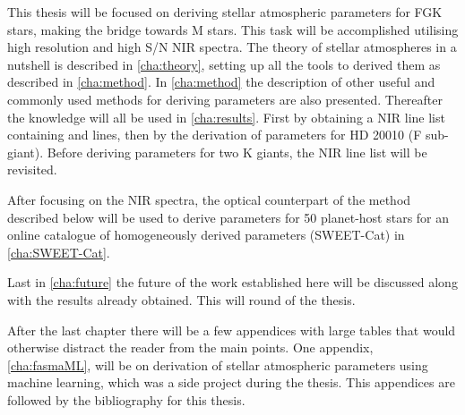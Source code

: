 This thesis will be focused on deriving stellar atmospheric parameters for FGK stars, making the
bridge towards M stars. This task will be accomplished utilising high resolution and high S/N NIR
spectra. The theory of stellar atmospheres in a nutshell is described in \cref{cha:theory}, setting
up all the tools to derived them as described in \cref{cha:method}. In \cref{cha:method} the
description of other useful and commonly used methods for deriving parameters are also presented.
Thereafter the knowledge will all be used in \cref{cha:results}. First by obtaining a NIR line list
containing  and  lines, then by the derivation of parameters for HD 20010 (F
sub-giant). Before deriving parameters for two K giants, the NIR line list will be revisited.

After focusing on the NIR spectra, the optical counterpart of the method described below will be
used to derive parameters for 50 planet-host stars for an online catalogue of homogeneously derived
parameters (SWEET-Cat) in \cref{cha:SWEET-Cat}.

Last in \cref{cha:future} the future of the work established here will be discussed along with the
results already obtained. This will round of the thesis.

After the last chapter there will be a few appendices with large tables that would otherwise
distract the reader from the main points. One appendix, \cref{cha:fasmaML}, will be on derivation of
stellar atmospheric parameters using machine learning, which was a side project during the thesis.
This appendices are followed by the bibliography for this thesis.
